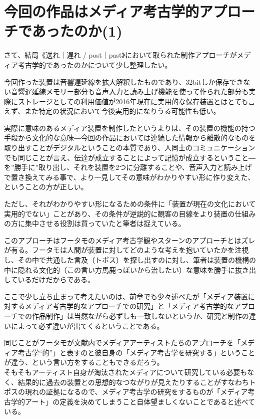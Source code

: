\documentclass[a4paper,report]{jsbook}
\begin{document}
\section{今回の作品はメディア考古学的アプローチであったのか(1)}\label{ux4ecaux56deux306eux4f5cux54c1ux306fux30e1ux30c7ux30a3ux30a2ux8003ux53e4ux5b66ux7684ux30a2ux30d7ux30edux30fcux30c1ux3067ux3042ux3063ux305fux306eux304b1}

さて、結局《送れ｜遅れ /
post｜past》において取られた制作アプローチがメディア考古学的であったのかについて少し整理したい。

今回作った装置は音響遅延線を拡大解釈したものであり、32bitしか保存できない音響遅延線メモリー部分も音声入力と読み上げ機能を使って作られた部分も実際にストレージとしての利用価値が2016年現在に実用的な保存装置とはとても言えず、また特定の状況において今後実用的になりうる可能性も低い。

実際に意味のあるメディア装置を制作したというよりは、その装置の機能の持つ手段から文化的な意味―今回の作品においては連続した情報から離散的なものを取り出すことがデジタルということの本質であり、人同士のコミュニケーションでも同じことが言え、伝達が成立することによって記憶が成立するということ―を''勝手に''取り出し、それを装置を2つに分離することや、音声入力と読み上げで置き換えてみる事で、より一見してその意味がわかりやすい形に作り変えた、ということの方が正しい。

ただし、それがわかりやすい形になるための条件に「装置が現在の文化において実用的でない」ことがあり、その条件が逆説的に観客の目線をより装置の仕組みの方に集中させる役割は買っていたと筆者は捉えている。

このアプローチはフータモのメディア考古学観やスターンのアプローチとはズレが有る。フータモは人間が装置に対してどのような考えを抱いていたかを注視し、その中で共通した言及（トポス）を探し出すのに対し、筆者は装置の機構の中に隠れる文化的（この言い方馬鹿っぽいから治したい）な意味を勝手に抜き出しているだけだからである。

ここで少し立ち止まって考えたいのは、前章でも少々述べたが「メディア装置に対するメディア考古学的なアプローチでの研究」と「メディア考古学的なアプローチでの作品制作」は当然ながら必ずしも一致しないというか、研究と制作の違いによって必ず違いが出てくるということである。

同じことがフータモが文献内でメディアアーティストたちのアプローチを「メディア考古学``的''」と表すのと彼自身の「メディア考古学を研究する」ということが違う、という言い方をすることもできるだろう。\\
そもそもアーティスト自身が淘汰されたメディアについて研究している必要もなく、結果的に過去の装置との思想的なつながりが見えたりすることがすなわちトポスの現れの証拠になるので、メディア考古学の研究をするものが「メディア考古学的アート」の定義を決めてしまうこと自体望ましくないことであると述べている。
\end{document}
